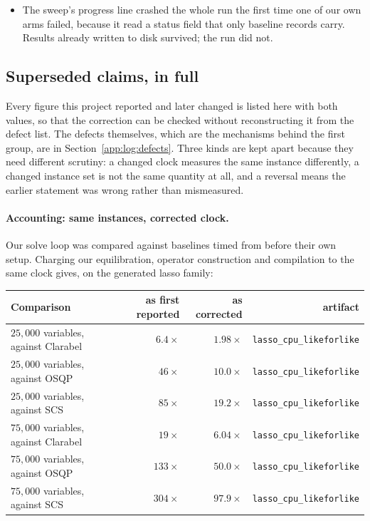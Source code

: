 \begin{itemize}
  an integer seed, permutes the entire index population: at $50{,}000 \times 100{,}000$
  that is a $37.3$ GiB allocation. It was killed by the operating system on every
  sweep above $75{,}000$ variables, so the largest sizes were unreachable for a reason
  that had nothing to do with any solver. Rejection sampling in the number of
  nonzeros replaces it and builds the same shape and nonzero count, $5.5$ million
  nonzeros in $3.9$ s within $0.53$ GB.
\item The sweep's progress line crashed the whole run the first time one of our own
  arms failed, because it read a status field that only baseline records carry.
  Results already written to disk survived; the run did not.
\end{itemize}

\subsection{Superseded claims, in full}
\label{app:log:superseded}

Every figure this project reported and later changed is listed here with both
values, so that the correction can be checked without reconstructing it from
the defect list. The defects themselves, which are the mechanisms behind the
first group, are in Section~\ref{app:log:defects}. Three kinds are kept apart
because they need different scrutiny: a changed clock measures the same
instance differently, a changed instance set is not the same quantity at all,
and a reversal means the earlier statement was wrong rather than mismeasured.

\paragraph{Accounting: same instances, corrected clock.}
Our solve loop was compared against baselines timed from before their own
setup. Charging our equilibration, operator construction and compilation to
the same clock gives, on the generated lasso family:

\begin{center}
\small
\begin{tabular}{lrrr}
\toprule
Comparison & as first reported & as corrected & artifact \\
\midrule
$25{,}000$ variables, against Clarabel & $6.4\times$ & $1.98\times$ & \texttt{lasso\_cpu\_likeforlike} \\
$25{,}000$ variables, against OSQP & $46\times$ & $10.0\times$ & \texttt{lasso\_cpu\_likeforlike} \\
$25{,}000$ variables, against SCS & $85\times$ & $19.2\times$ & \texttt{lasso\_cpu\_likeforlike} \\
$75{,}000$ variables, against Clarabel & $19\times$ & $6.04\times$ & \texttt{lasso\_cpu\_likeforlike} \\
$75{,}000$ variables, against OSQP & $133\times$ & $50.0\times$ & \texttt{lasso\_cpu\_likeforlike} \\
$75{,}000$ variables, against SCS & $304\times$ & $97.9\times$ & \texttt{lasso\_cpu\_likeforlike} \\
\bottomrule
\end{tabular}
\end{center}

